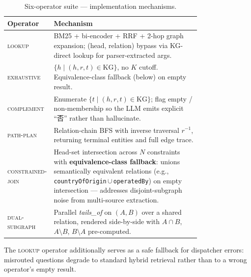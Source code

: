 \documentclass[review]{elsarticle}
\newcommand{\op}[1]{\textsc{\small #1}}
\begin{document}
\begin{table}[t]
\centering
\small
\caption{Six-operator suite --- implementation mechanisms.}
\label{tab:operators}
\begin{tabular}{l p{0.78\linewidth}}
\toprule
\textbf{Operator} & \textbf{Mechanism} \\
\midrule
\op{lookup}            & BM25 + bi-encoder + RRF + 2-hop graph expansion; (head, relation) bypass via KG-direct lookup for parser-extracted args. \\
\op{exhaustive}        & $\{h \mid (h, r, t) \in \text{KG}\}$, no $K$ cutoff. Equivalence-class fallback (below) on empty result. \\
\op{complement}        & Enumerate $\{t \mid (h, r, t) \in \text{KG}\}$; flag empty / non-membership so the LLM emits explicit ``否'' rather than hallucinate. \\
\op{path-plan}         & Relation-chain BFS with inverse traversal $r^{-1}$, returning terminal entities and full edge trace. \\
\op{constrained-join}  & Head-set intersection across $N$ constraints with \textbf{equivalence-class fallback}: unions semantically equivalent relations (e.g., \texttt{countryOfOrigin}\,$\cup$\,\texttt{operatedBy}) on empty intersection --- addresses disjoint-subgraph noise from multi-source extraction. \\
\op{dual-subgraph}     & Parallel \textit{tails\_of} on $(A,B)$ over a shared relation, rendered side-by-side with $A\!\cap\!B$, $A{\setminus}B$, $B{\setminus}A$ pre-computed. \\
\bottomrule
\end{tabular}
\end{table}

The \op{lookup} operator additionally serves as a safe fallback for dispatcher errors: misrouted questions degrade to standard hybrid retrieval rather than to a wrong operator's empty result.
\end{document}
